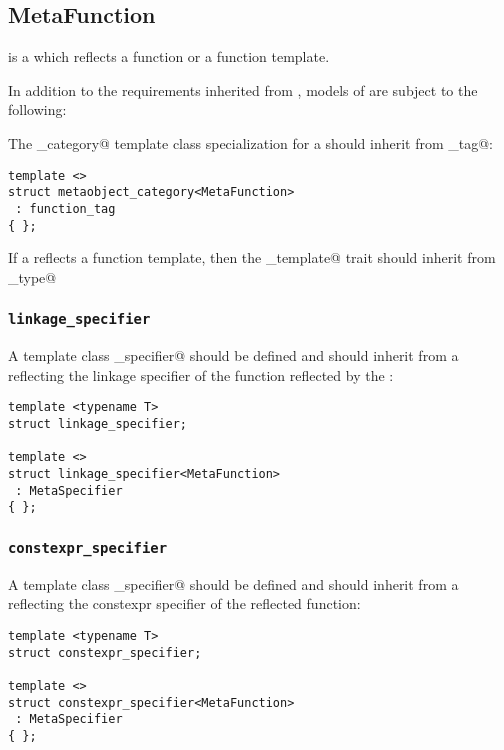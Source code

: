 \subsection{MetaFunction}
\label{concept-MetaFunction}

 is a  which reflects a function or a function template.

In addition to the requirements inherited from ,
models of  are subject to the following:

The \verb@metaobject_category@ template class specialization for a  should
inherit from \verb@function_tag@:

\begin{verbatim}
template <>
struct metaobject_category<MetaFunction>
 : function_tag
{ };
\end{verbatim}

If a  reflects a function template, then the \verb@is_template@
trait should inherit from \verb@true_type@

\subsubsection{\texttt{linkage\_specifier}}

A template class \verb@linkage_specifier@ should be defined and should inherit from
a  reflecting the linkage specifier of the function reflected by
the :

\begin{verbatim}
template <typename T>
struct linkage_specifier;

template <>
struct linkage_specifier<MetaFunction>
 : MetaSpecifier
{ };
\end{verbatim}

\subsubsection{\texttt{constexpr\_specifier}}

A template class \verb@constexpr_specifier@ should be defined and should inherit from
a  reflecting the constexpr specifier of the reflected function:

\begin{verbatim}
template <typename T>
struct constexpr_specifier;

template <>
struct constexpr_specifier<MetaFunction>
 : MetaSpecifier
{ };
\end{verbatim}

